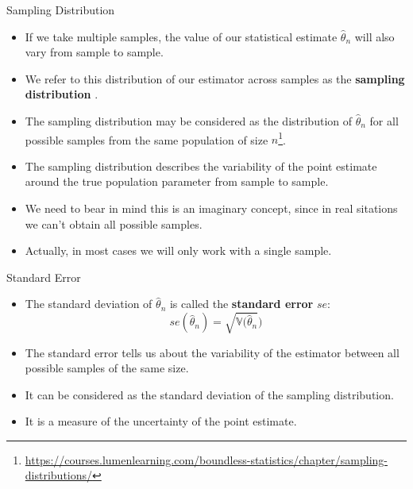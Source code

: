 \documentclass[handout]{beamer}
\begin{document}
\begin{frame}{Sampling Distribution}

\scriptsize{

\begin{itemize}
\item If we take multiple samples, the value of our statistical estimate $\hat{\theta}_n$ will also vary from sample to sample.

\item We refer to this distribution of our estimator across samples as the   \textbf{sampling distribution} \cite{poldrack2019statistical}.

\item The sampling distribution may be considered as the distribution of  $\hat{\theta}_n$ for all possible samples from the same population of size $n$\footnote{\url{https://courses.lumenlearning.com/boundless-statistics/chapter/sampling-distributions/}}.

\item The sampling distribution describes the variability of the point estimate around the true population parameter from sample to sample. 

\item We need to bear in mind this is an imaginary concept, since in real sitations we can't obtain all possible samples.

\item Actually, in most cases we will only work with a single sample.

\end{itemize}

} 
\end{frame}


\begin{frame}{Standard Error}

\scriptsize{

\begin{itemize}
\item The standard deviation of $\hat{\theta}_n$ is called the \textbf{standard error} $se$:
\begin{displaymath}
se(\hat{\theta}_n)=\sqrt{\mathbb{V}(\hat{\theta}_n})
\end{displaymath}
\item The standard error tells us about the variability of the estimator between all possible samples of the same size.
\item It can be considered as the standard deviation of the sampling distribution. 
\item It is a measure of the uncertainty of the point estimate.
\end{itemize}

} 
\end{frame}
\end{document}
